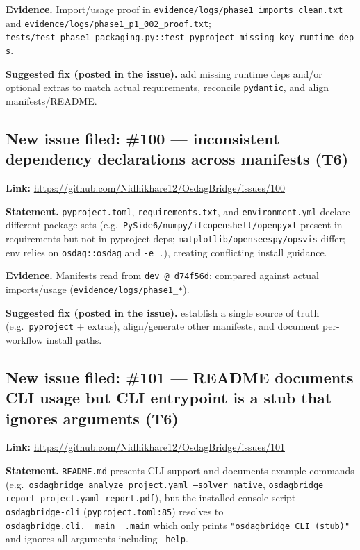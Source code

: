 \documentclass[11pt,a4paper]{article}
\begin{document}
\textbf{Evidence.} Import/usage proof in \texttt{evidence/logs/phase1\_imports\_clean.txt} and \texttt{evidence/logs/phase1\_p1\_002\_proof.txt}; \texttt{tests/test\_phase1\_packaging.py::test\_pyproject\_missing\_key\_runtime\_deps}.

\textbf{Suggested fix (posted in the issue).} add missing runtime deps and/or optional extras to match actual requirements, reconcile \texttt{pydantic}, and align manifests/README.

\subsection{New issue filed: \#100 --- inconsistent dependency declarations across manifests (T6)}
\textbf{Link:} \url{https://github.com/Nidhikhare12/OsdagBridge/issues/100}

\textbf{Statement.} \texttt{pyproject.toml}, \texttt{requirements.txt}, and \texttt{environment.yml} declare different package sets (e.g.\ \texttt{PySide6/numpy/ifcopenshell/openpyxl} present in requirements but not in pyproject deps; \texttt{matplotlib/openseespy/opsvis} differ; env relies on \texttt{osdag::osdag} and \texttt{-e .}), creating conflicting install guidance.

\textbf{Evidence.} Manifests read from \texttt{dev @ d74f56d}; compared against actual imports/usage (\texttt{evidence/logs/phase1\_*}).

\textbf{Suggested fix (posted in the issue).} establish a single source of truth (e.g.\ \texttt{pyproject} + extras), align/generate other manifests, and document per-workflow install paths.

\subsection{New issue filed: \#101 --- README documents CLI usage but CLI entrypoint is a stub that ignores arguments (T6)}
\textbf{Link:} \url{https://github.com/Nidhikhare12/OsdagBridge/issues/101}

\textbf{Statement.} \texttt{README.md} presents CLI support and documents example commands (e.g.\ \texttt{osdagbridge analyze project.yaml --solver native}, \texttt{osdagbridge report project.yaml report.pdf}), but the installed console script \texttt{osdagbridge-cli} (\texttt{pyproject.toml:85}) resolves to \texttt{osdagbridge.cli.\_\_main\_\_.main} which only prints \texttt{"osdagbridge CLI (stub)"} and ignores all arguments including \texttt{--help}.
\end{document}
